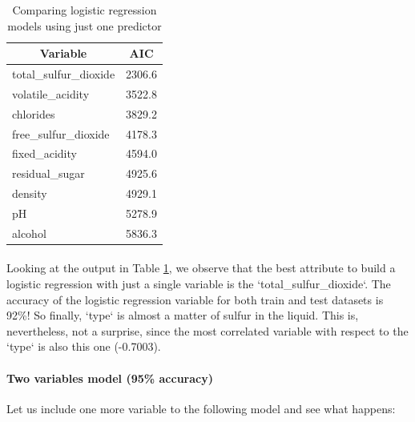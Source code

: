 \documentclass[10pt]{article}
\begin{document}
\begin{table}[H]
	\centering
	\begin{tabular}{|l|l|}
		\hline
		\multicolumn{1}{|c|}{\textbf{Variable}} & \multicolumn{1}{c|}{\textbf{AIC}} \\ \hline
		total\_sulfur\_dioxide                  & 2306.6                            \\ \hline
		volatile\_acidity                       & 3522.8                            \\ \hline
		chlorides                               & 3829.2                            \\ \hline
		free\_sulfur\_dioxide                   & 4178.3                            \\ \hline
		fixed\_acidity                          & 4594.0                            \\ \hline
		residual\_sugar                         & 4925.6                            \\ \hline
		density                                 & 4929.1                            \\ \hline
		pH                                      & 5278.9                            \\ \hline
		alcohol                                 & 5836.3                            \\ \hline
	\end{tabular}
	\caption{Comparing logistic regression models using just one predictor}
	\label{table:one-predictor}
\end{table}

\paragraph*{}
Looking at the output in Table \ref{table:one-predictor}, we observe that the best attribute to build a logistic regression with just a single variable is the `total\_sulfur\_dioxide`. The accuracy of the logistic regression variable for both train and test datasets is 92\%! So finally, `type` is almost a matter of sulfur in the liquid. This is, nevertheless, not a surprise, since the most correlated variable with respect to the `type` is also this one (-0.7003).

\paragraph{Two variables model (95\% accuracy)}
Let us include one more variable to the following model and see what happens:
\end{document}

